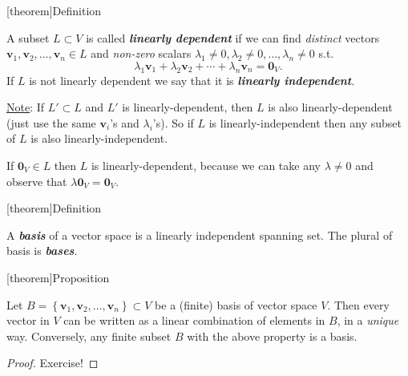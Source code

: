 \documentclass[12pt]{report}
\theoremstyle{definition}
\begin{document}
[theorem]{Definition}
\begin{linear independence}
    A subset $L \subset V$ is called \textbf{\emph{linearly dependent}} if
    we can find \emph{distinct} vectors $\mathbf{v}_1, \mathbf{v}_2,\ldots,\mathbf{v}_n \in L$
    and \emph{non-zero} scalars $\lambda_1 \neq 0, \lambda_2 \neq 0,\ldots,\lambda_n \neq 0$ s.t.\[
        \lambda_1 \mathbf{v}_1 + \lambda_2 \mathbf{v}_2 + \cdots + \lambda_n \mathbf{v}_n = \mathbf{0}_V.
    \]
    If $L$ is not linearly dependent we say that it is \textbf{\emph{linearly independent}}.
\end{linear independence}

\underline{Note}: If $L' \subset L$ and $L'$ is linearly-dependent,
then $L$ is also linearly-dependent (just use the same $\mathbf{v}_i$'s and $\lambda_i$'s).
So if $L$ is linearly-independent then any subset of $L$ is also linearly-independent.

\begin{ex}
    If $\mathbf{0}_V \in L$ then $L$ is linearly-dependent,
    because we can take any $\lambda \neq 0$ and observe that $\lambda \mathbf{0}_V = \mathbf{0}_V$.
\end{ex}

[theorem]{Definition}
\begin{basis}
    A \textbf{\emph{basis}} of a vector space is a linearly independent spanning set.
    The plural of basis is \textbf{\emph{bases}}.
\end{basis}

[theorem]{Proposition}
\begin{v can be written with element of basis}\label{prop:1}
    Let $B = \left\{\mathbf{v}_1, \mathbf{v}_2, \ldots, \mathbf{v}_n\right\} \subset V$ be a (finite)
    basis of vector space $V$. Then every vector in $V$ can be written as a linear combination
    of elements in $B$, in a \emph{unique} way.
    Conversely, any finite subset $B$ with the above property is a basis.
\end{v can be written with element of basis}

\begin{proof}
    Exercise!
\end{proof}
\end{document}
